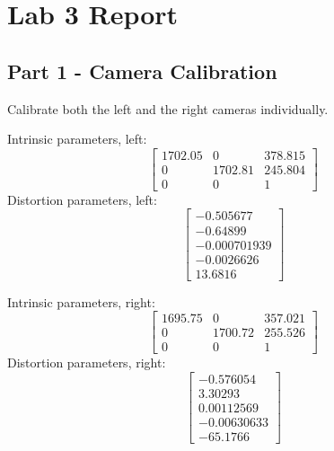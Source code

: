 \documentclass[12pt,a4paper,final]{article}
\begin{document}
\section*{Lab 3 Report}

\subsection*{Part 1 - Camera Calibration}
Calibrate both the left and the right cameras individually. 



Intrinsic parameters, left:
\begin{equation}
\begin{bmatrix}
1702.05& 0 &378.815\\ 0 &1702.81 &245.804 \\0& 0 &1
\end{bmatrix}
\end{equation}
Distortion parameters, left: 
\begin{equation}
\begin{bmatrix}
-0.505677 \\-0.64899 \\-0.000701939 \\-0.0026626 \\13.6816
\end{bmatrix}
\end{equation}

Intrinsic parameters, right:
\begin{equation}
\begin{bmatrix}
1695.75 &0 &357.021 \\0 &1700.72& 255.526 \\0 &0 &1
\end{bmatrix}
\end{equation}
Distortion parameters, right: 
\begin{equation}
\begin{bmatrix}
-0.576054 \\3.30293 \\0.00112569 \\-0.00630633 \\-65.1766
\end{bmatrix}
\end{equation}

\end{document}
